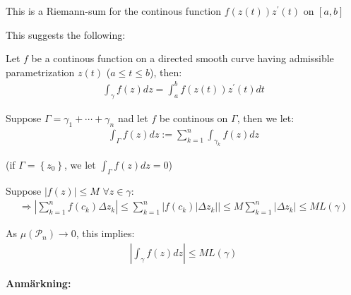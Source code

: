 \noindent This is a Riemann-sum for the continous function $f(z(t))z^{\prime}(t)$  on $[a,b]$
\par\bigskip
\noindent This suggests the following:
\par\bigskip
\begin{theo}{}
  Let $f$ be a continous function on a directed smooth curve having admissible parametrization $z(t)$ ($a\leq t\leq b$), then:
  \begin{equation*}
    \begin{gathered}
      \int_{\gamma}f(z)dz = \int_{a}^{b}f(z(t))z^{\prime}(t)dt
    \end{gathered}
  \end{equation*}
\end{theo}
\par\bigskip
\begin{theo}[]{}
  Suppose $\Gamma = \gamma_1+\cdots+\gamma_n$ nad let $f$ be continous on $\Gamma$, then we let:
  \begin{equation*}
    \begin{gathered}
      \int_{\Gamma}f(z)dz:=\sum_{k=1}^{n}\int_{\gamma_k}f(z)dz
    \end{gathered}
  \end{equation*}
  \par\bigskip
  \noindent (if $\Gamma  = \left\{z_0\right\}$, we let $\int_{\Gamma}f(z)dz = 0$)
\end{theo}
\par\bigskip
\begin{theo}[ML-inequality]{}
  Suppose $\left|f(z)\right|\leq M$ $\forall z\in\gamma$:
  \begin{equation*}
    \begin{gathered}
      \Rightarrow \left|\sum_{k=1}^{n}f(c_k)\Delta z_k\right|\leq\sum_{k=1}^{n}\left|f(c_k)\left|\Delta z_k\right|\right|\leq M\sum_{k=1}^{n}\left|\Delta z_k\right|\leq ML(\gamma)
    \end{gathered}
  \end{equation*}
  \par\bigskip
  \noindent As $\mu(\mathcal{P}_n)\to0$, this implies:
  \begin{equation*}
    \begin{gathered}
      \left|\int_{\gamma}f(z)dz\right|\leq ML(\gamma)
    \end{gathered}
  \end{equation*}
\end{theo}
\par\bigskip
\noindent\textbf{Anmärkning:}\par
